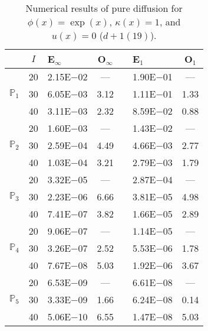 \begin{table}[H]
\centering
\caption{Numerical results of pure diffusion for $\phi(x)=\exp(x)$, $\kappa(x)=1$, and $u(x)=0$ ($d+1 (19)$).}
\begin{tabular}{@{}l c l c c l c@{}}
\toprule
 & $I$ & E$_{\infty}$ & O$_{\infty}$ && E$_1$ & O$_1$\\
\midrule
\multirow{3}{*}{$\mathbb{P}_{1}$}
 & 20 & 2.15E$-$02 & --- && 1.90E$-$01 & ---\\
 & 30 & 6.05E$-$03 & 3.12 && 1.11E$-$01 & 1.33\\
 & 40 & 3.11E$-$03 & 2.32 && 8.59E$-$02 & 0.88\\
\midrule
\multirow{3}{*}{$\mathbb{P}_{2}$}
 & 20 & 1.60E$-$03 & --- && 1.43E$-$02 & ---\\
 & 30 & 2.59E$-$04 & 4.49 && 4.66E$-$03 & 2.77\\
 & 40 & 1.03E$-$04 & 3.21 && 2.79E$-$03 & 1.79\\
\midrule
\multirow{3}{*}{$\mathbb{P}_{3}$}
 & 20 & 3.32E$-$05 & --- && 2.87E$-$04 & ---\\
 & 30 & 2.23E$-$06 & 6.66 && 3.81E$-$05 & 4.98\\
 & 40 & 7.41E$-$07 & 3.82 && 1.66E$-$05 & 2.89\\
\midrule
\multirow{3}{*}{$\mathbb{P}_{4}$}
 & 20 & 9.06E$-$07 & --- && 1.14E$-$05 & ---\\
 & 30 & 3.26E$-$07 & 2.52 && 5.53E$-$06 & 1.78\\
 & 40 & 7.67E$-$08 & 5.03 && 1.92E$-$06 & 3.67\\
\midrule
\multirow{3}{*}{$\mathbb{P}_{5}$}
 & 20 & 6.53E$-$09 & --- && 6.61E$-$08 & ---\\
 & 30 & 3.33E$-$09 & 1.66 && 6.24E$-$08 & 0.14\\
 & 40 & 5.06E$-$10 & 6.55 && 1.47E$-$08 & 5.03\\
\bottomrule
\end{tabular}
\end{table}